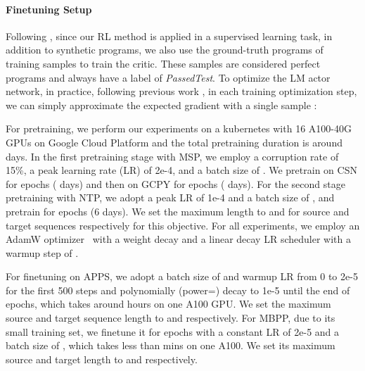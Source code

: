 \documentclass{article}
\begin{document}
\paragraph{Finetuning Setup}
Following \citep{bahdanau2016actor}, since our RL method is applied in a supervised learning task, in addition to synthetic programs, we also use the ground-truth programs of training samples to train the critic.
These samples are considered perfect programs and always have a label of \emph{PassedTest}. 
To optimize the LM actor network, in practice, following previous work \citep{bahdanau2016actor, rennie2017self, wang2018video}, 
in each training optimization step, we can simply approximate the expected gradient with a single sample :


For pretraining, we perform our experiments on a kubernetes with 16 A100-40G GPUs on Google Cloud Platform and the total pretraining duration is around  days.
In the first  pretraining stage with MSP, we employ a corruption rate of 15\%, a peak learning rate (LR) of 2e-4, and a batch size of . We pretrain on CSN for  epochs ( days) and then on GCPY for  epochs ( days). 
For the second stage pretraining with NTP, we adopt a peak LR of 1e-4 and a batch size of , and pretrain for  epochs (6 days). We set the maximum length to  and  for source and target sequences respectively for this objective.
For all  experiments, we employ an AdamW optimizer~\citep{DBLP:conf/iclr/LoshchilovH19} with a  weight decay and a linear decay LR scheduler with a warmup step of . 

For finetuning on APPS, we adopt a batch size of  and warmup LR from 0 to 2e-5 for the first 500 steps and polynomially (power=) decay to 1e-5 until the end of  epochs, which takes around  hours on one A100 GPU. We set the maximum source and target sequence length to  and  respectively. For MBPP, due to its small training set, we finetune it for  epochs with a constant LR of 2e-5 and a batch size of , which takes less than  mins on one A100. We set its  maximum source and target  length to  and  respectively.

\fi
\end{document}
